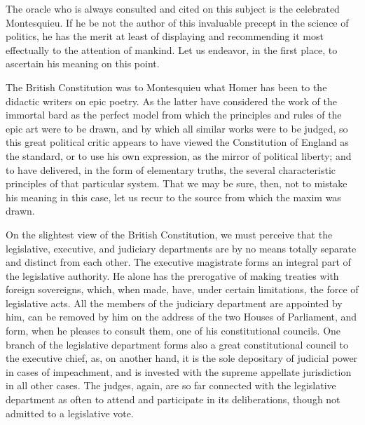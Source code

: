 The oracle who is always consulted and cited on this subject is the celebrated Montesquieu. If he be not the author of this invaluable precept in the science of politics, he has the merit at least of displaying and recommending it most effectually to the attention of mankind. Let us endeavor, in the first place, to ascertain his meaning on this point.

The British Constitution was to Montesquieu what Homer has been to the didactic writers on epic poetry. As the latter have considered the work of the immortal bard as the perfect model from which the principles and rules of the epic art were to be drawn, and by which all similar works were to be judged, so this great political critic appears to have viewed the Constitution of England as the standard, or to use his own expression, as the mirror of political liberty; and to have delivered, in the form of elementary truths, the several characteristic principles of that particular system. That we may be sure, then, not to mistake his meaning in this case, let us recur to the source from which the maxim was drawn.

On the slightest view of the British Constitution, we must perceive that the legislative, executive, and judiciary departments are by no means totally separate and distinct from each other. The executive magistrate forms an integral part of the legislative authority. He alone has the prerogative of making treaties with foreign sovereigns, which, when made, have, under certain limitations, the force of legislative acts. All the members of the judiciary department are appointed by him, can be removed by him on the address of the two Houses of Parliament, and form, when he pleases to consult them, one of his constitutional councils. One branch of the legislative department forms also a great constitutional council to the executive chief, as, on another hand, it is the sole depositary of judicial power in cases of impeachment, and is invested with the supreme appellate jurisdiction in all other cases. The judges, again, are so far connected with the legislative department as often to attend and participate in its deliberations, though not admitted to a legislative vote.

